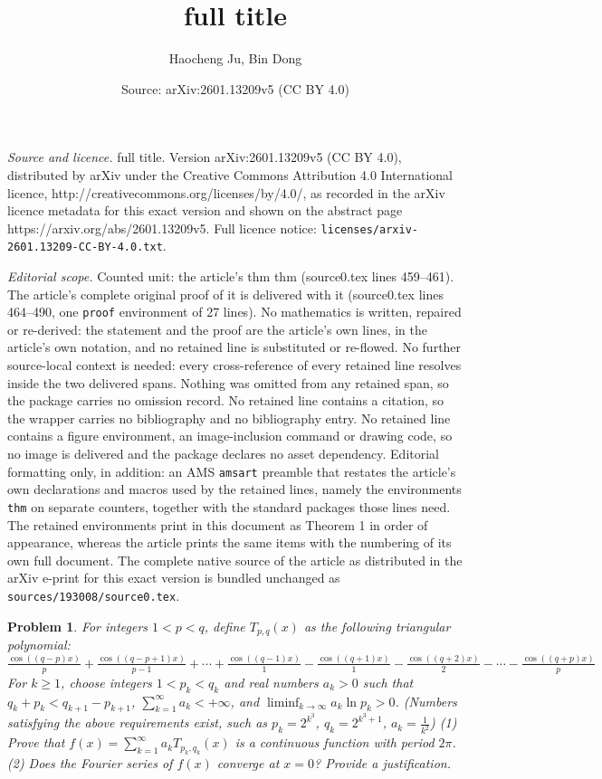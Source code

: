 \documentclass[10pt,a4paper]{amsart}
\title{full title}
\author{Haocheng Ju, Bin Dong}
\date{Source: arXiv:2601.13209v5 (CC BY 4.0)}
\newtheorem{thm}{Problem}
\begin{document}
\maketitle

\noindent\emph{Source and licence.} full title. Version arXiv:2601.13209v5 (CC BY 4.0), distributed by arXiv under the Creative Commons Attribution 4.0 International licence, http://creativecommons.org/licenses/by/4.0/, as recorded in the arXiv licence metadata for this exact version and shown on the abstract page https://arxiv.org/abs/2601.13209v5. Full licence notice: \texttt{licenses/arxiv-2601.13209-CC-BY-4.0.txt}.\par\smallskip

\noindent\textit{Editorial scope.} Counted unit: the article's thm thm (source0.tex lines 459--461). The article's complete original proof of it is delivered with it (source0.tex lines 464--490, one \texttt{proof} environment of 27 lines). No mathematics is written, repaired or re-derived: the statement and the proof are the article's own lines, in the article's own notation, and no retained line is substituted or re-flowed.  No further source-local context is needed: every cross-reference of every retained line resolves inside the two delivered spans.  Nothing was omitted from any retained span, so the package carries no omission record.  No retained line contains a citation, so the wrapper carries no bibliography and no bibliography entry.  No retained line contains a figure environment, an image-inclusion command or drawing code, so no image is delivered and the package declares no asset dependency.  Editorial formatting only, in addition: an AMS \texttt{amsart} preamble that restates the article's own declarations and macros used by the retained lines, namely the environments \texttt{thm} on separate counters, together with the standard packages those lines need.  The retained environments print in this document as Theorem 1 in order of appearance, whereas the article prints the same items with the numbering of its own full document.  The complete native source of the article as distributed in the arXiv e-print for this exact version is bundled unchanged as \texttt{sources/193008/source0.tex}.
\begin{thm}
For integers $1 < p < q$, define $T_{p, q}(x)$ as the following triangular polynomial: $\frac{\cos((q-p)x)}{p} + \frac{\cos((q-p+1)x)}{p-1} + \cdots + \frac{\cos((q-1)x)}{1} - \frac{\cos((q+1)x)}{1} - \frac{\cos((q+2)x)}{2} - \cdots - \frac{\cos((q+p)x)}{p}$ For $k \geq 1$, choose integers $1 < p_k < q_k$ and real numbers $a_k > 0$ such that $q_k + p_k < q_{k+1} - p_{k+1}$, $\sum_{k=1}^{\infty} a_k < +\infty$, and $\liminf_{k \to \infty} a_k \ln p_k > 0$. (Numbers satisfying the above requirements exist, such as $p_k = 2^{k^3}$, $q_k = 2^{k^3 + 1}$, $a_k = \frac{1}{k^2}$) (1) Prove that $f(x) = \sum_{k=1}^{\infty} a_k T_{p_k, q_k}(x)$ is a continuous function with period $2\pi$. (2) Does the Fourier series of $f(x)$ converge at $x = 0$? Provide a justification.
\end{thm}
\end{document}
